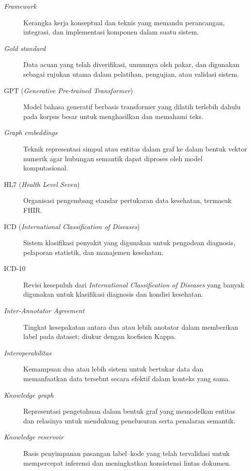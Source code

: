 {\begin{description}
    \item[\textit{Framework}] Kerangka kerja konseptual dan teknis yang memandu perancangan, integrasi, dan implementasi komponen dalam suatu sistem.

    \item[\textit{Gold standard}] Data acuan yang telah diverifikasi, umumnya oleh pakar, dan digunakan sebagai rujukan utama dalam pelatihan, pengujian, atau validasi sistem.

    \item[GPT (\textit{Generative Pre-trained Transformer})] Model bahasa generatif berbasis transformer yang dilatih terlebih dahulu pada korpus besar untuk menghasilkan dan memahami teks.

    \item[\textit{Graph embeddings}] Teknik representasi simpul atau entitas dalam graf ke dalam bentuk vektor numerik agar hubungan semantik dapat diproses oleh model komputasional.

    \item[HL7 (\textit{Health Level Seven})] Organisasi pengembang standar pertukaran data kesehatan, termasuk FHIR.

    \item[ICD (\textit{International Classification of Diseases})] Sistem klasifikasi penyakit yang digunakan untuk pengodean diagnosis, pelaporan statistik, dan manajemen kesehatan.

    \item[ICD-10] Revisi kesepuluh dari \textit{International Classification of Diseases} yang banyak digunakan untuk klasifikasi diagnosis dan kondisi kesehatan.

    \item[\textit{Inter-Annotator Agreement}] Tingkat kesepakatan antara dua atau lebih anotator dalam memberikan label pada dataset; diukur dengan koefisien Kappa.

    \item[\textit{Interoperabilitas}] Kemampuan dua atau lebih sistem untuk bertukar data dan memanfaatkan data tersebut secara efektif dalam konteks yang sama.

    \item[\textit{Knowledge graph}] Representasi pengetahuan dalam bentuk graf yang memodelkan entitas dan relasinya untuk mendukung penelusuran serta penalaran semantik.

    \item[\textit{Knowledge reservoir}] Basis penyimpanan pasangan label--kode yang telah tervalidasi untuk mempercepat inferensi dan meningkatkan konsistensi lintas dokumen.


\end{description}}
